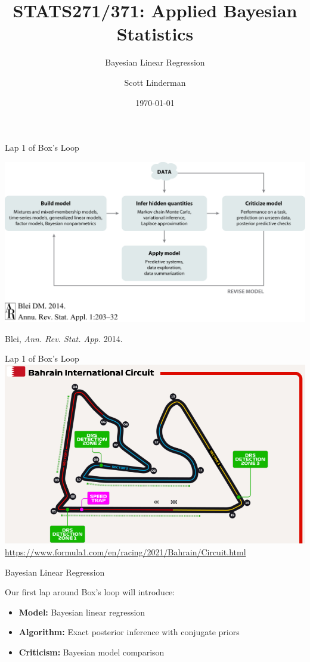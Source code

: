 \documentclass[aspectratio=169]{beamer}
\title{STATS271/371: Applied Bayesian Statistics}
\subtitle{Bayesian Linear Regression}
\author{Scott Linderman}
\date{\today}
\begin{document}
\maketitle


\begin{frame}{Lap 1 of Box's Loop}
\begin{center}
\includegraphics[width=.85\linewidth]{figures/lap1/boxsloop.jpeg}\\
\end{center} 
\begin{flushright}
{\footnotesize Blei, \textit{Ann. Rev. Stat. App.} 2014.}
\end{flushright}
\end{frame}


\begin{frame}{Lap 1 of Box's Loop}
\centering 
\includegraphics[width=.7\linewidth]{figures/lap1/bahrain.png}
{\footnotesize \url{https://www.formula1.com/en/racing/2021/Bahrain/Circuit.html}}
\end{frame}

\begin{frame}{Bayesian Linear Regression}

Our first lap around Box's loop will introduce:
\begin{itemize}
    \item \textbf{Model:} Bayesian linear regression
    \item \textbf{Algorithm:} Exact posterior inference with conjugate priors
    \item \textbf{Criticism:} Bayesian model comparison
\end{itemize}

\end{frame}
\end{document}
